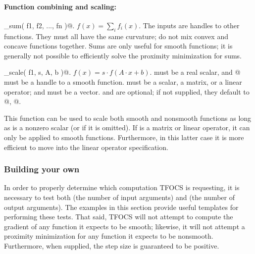 \documentclass{article}
\begin{document}
\paragraph{Function combining and scaling:}
\begin{trivlist}
\item \verb@tfunc_sum( f1, f2, ..., fn )@. $f(x)=\sum_i f_i(x)$. The
inputs are handles to other functions. They must all have the same curvature;
do not mix convex and concave functions together.
Sums are only useful for smooth functions; it is generally not possible
to efficiently solve the proximity minimization for sums.
\item \verb@tfunc_scale( f1, s, A, b )@. $f(x)=s\cdot f(A\cdot x + b)$. \verb@s@ must
be a real scalar, and @ must be a handle to a smooth function. \verb@A@
must be a scalar, a matrix, or a linear operator; and \verb@b@ must be a vector.
\verb@A@ and \verb@b@ are optional; if not supplied, they default to @, @.

This function can be used to scale both smooth and nonsmooth functions
as long as \verb@A@ is a nonzero scalar (or if it is omitted). If \verb@A@
is a matrix or linear operator, it can only be applied to smooth functions.
Furthermore, in this latter case it is more efficient to move \verb@A@ into the
linear operator specification.
\end{trivlist}


\subsubsection{Building your own}
\label{sec:smoothb}

In order to properly determine which computation TFOCS is requesting,
it is necessary to test both \verb@nargin@ (the number of input arguments)
and \verb@nargout@ (the number of output arguments). The examples
in this section provide useful templates for performing these tests.
That said,  TFOCS will not attempt to compute the gradient of any function
it expects to be smooth; likewise, it will not attempt a proximity
minimization for any function it expects to be nonsmooth. Furthermore,
when supplied, the step size \verb@t@ is guaranteed to be positive.
\end{document}

